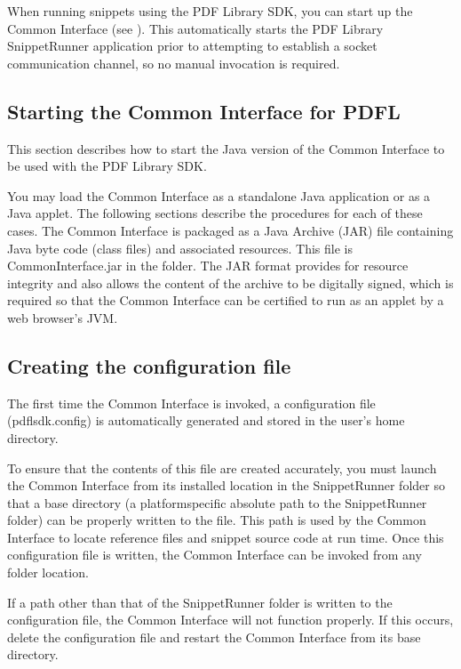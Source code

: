\documentclass[letterpaper,12pt,english,openany,oneside]{sphinxmanual}
\begin{document}
When running snippets using the PDF Library SDK, you can start up the Common Interface (see ). This automatically starts the PDF Library SnippetRunner application prior to attempting to establish a socket communication channel, so no manual invocation is required.




\subsection{Starting the Common Interface for PDFL}
\label{\detokenize{Snippet_SnippetRunnerCookbook:starting-the-common-interface-for-pdfl}}
This section describes how to start the Java version of the Common Interface to be used with the PDF Library SDK.

You may load the Common Interface as a standalone Java application or as a Java applet. The following sections describe the procedures for each of these cases. The Common Interface is packaged as a Java Archive (JAR) file containing Java byte code (class files) and associated resources. This file is CommonInterface.jar in the  folder. The JAR format provides for resource integrity and also allows the content of the archive to be digitally signed, which is required so that the Common Interface can be certified to run as an applet by a web browser’s JVM.


\subsection{Creating the configuration file}
\label{\detokenize{Snippet_SnippetRunnerCookbook:creating-the-configuration-file}}
The first time the Common Interface is invoked, a configuration file (pdflsdk.config) is automatically generated and stored in the user’s home directory.

To ensure that the contents of this file are created accurately, you must launch the Common Interface from its installed location in the SnippetRunner folder so that a base directory (a platform\sphinxhyphen{}specific absolute path to the SnippetRunner folder) can be properly written to the file. This path is used by the Common Interface to locate reference files and snippet source code at run time. Once this configuration file is written, the Common Interface can be invoked from any folder location.

If a path other than that of the SnippetRunner folder is written to the configuration file, the Common Interface will not function properly. If this occurs, delete the configuration file and restart the Common Interface from its base directory.
\end{document}
